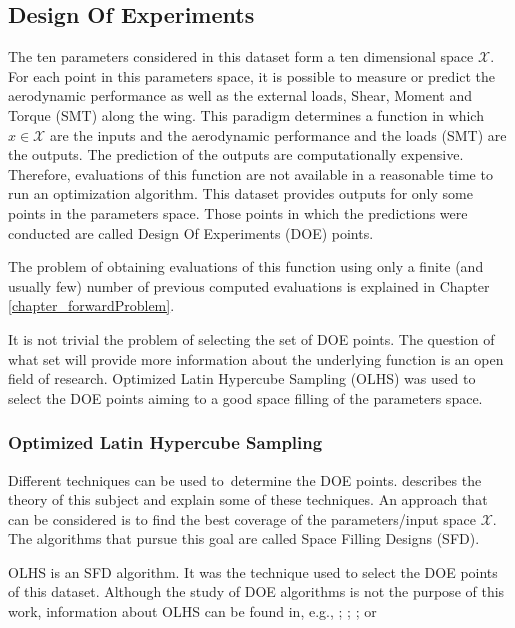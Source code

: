 \subsection{Design Of Experiments} \label{sec_DOE}

The ten parameters considered in this dataset form a ten dimensional space $\mathcal{X}$. For each point in this parameters space, it is possible to measure or predict the aerodynamic performance as well as the external loads, Shear, Moment and Torque (SMT) along the wing. This paradigm determines a function in which $x \in \mathcal{X}$ are the inputs and the aerodynamic performance and the loads (SMT) are the outputs. The prediction of the outputs are computationally expensive. Therefore, evaluations of this function are not available in a reasonable time to run an optimization algorithm. This dataset provides outputs for only some points in the parameters space. Those points in which the predictions were conducted are called Design Of Experiments (DOE) points. 

The problem of obtaining evaluations of this function using only a finite (and usually few) number of previous computed evaluations is explained in Chapter \ref{chapter_forwardProblem}. %

It is not trivial the problem of selecting the set of DOE points. The question of what set will provide more information about the underlying function is an open field of research. Optimized Latin Hypercube Sampling (OLHS) was used to select the DOE points aiming to a good space filling of the parameters space.    

\subsubsection{Optimized Latin Hypercube Sampling}

Different techniques can be used to determine the DOE points. \textcite{santner2003} describes the theory of this subject and explain some of these techniques. An approach that can be considered is to find the best coverage of the parameters/input space $\mathcal{X}$. The algorithms that pursue this goal are called Space Filling Designs (SFD).
 
OLHS is an SFD algorithm. It was the technique used to select the DOE points of this dataset. Although the study of DOE algorithms is not the purpose of this work, information about OLHS can be found in, e.g., \textcite{santner2003}; \textcite{damblin2013}; \textcite{li2017}; or \textcite{xiong2009} 

